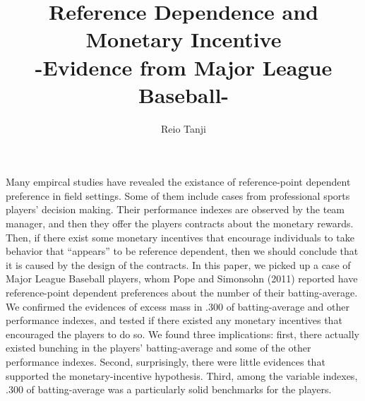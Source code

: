 \documentclass[dvipdfmx, 12pt]{article}
\begin{document}
\title{Reference Dependence and Monetary Incentive \\
-Evidence from Major League Baseball-}
\author{Reio Tanji}
\date{}
\maketitle

Many empircal studies have revealed the existance of reference-point dependent preference in field settings. Some of them include cases from professional sports players' decision making. Their performance indexes are observed by the team manager, and then they offer the players contracts about the monetary rewards. Then, if there exist some monetary incentives that encourage individuals to take behavior that ``appears'' to be reference dependent, then we should conclude that it is caused by the design of the contracts. In this paper, we picked up a case of Major League Baseball players, whom Pope and Simonsohn (2011) reported have reference-point dependent preferences about the number of their batting-average. We confirmed the evidences of excess mass in .300 of batting-average and other performance indexes, and tested if there existed any monetary incentives that encouraged the players to do so. We found three implications: first, there actually existed bunching in the players' batting-average and some of the other performance indexes. Second, surprisingly, there were little evidences that supported the monetary-incentive hypothesis. Third, among the variable indexes, .300 of batting-average was a particularly solid benchmarks for the players.
\end{document}
